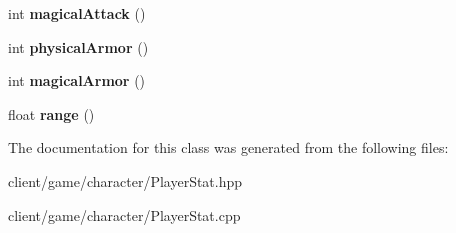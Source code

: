 \begin{DoxyCompactItemize}
\item 
\hypertarget{classgame_1_1_player_stat_a3e2e8f2b1d0427e9d9cf4bb9c482c909}{int {\bfseries magical\-Attack} ()}\label{classgame_1_1_player_stat_a3e2e8f2b1d0427e9d9cf4bb9c482c909}

\item 
\hypertarget{classgame_1_1_player_stat_a0db1adc0a2061d529905a4af4fae0bb7}{int {\bfseries physical\-Armor} ()}\label{classgame_1_1_player_stat_a0db1adc0a2061d529905a4af4fae0bb7}

\item 
\hypertarget{classgame_1_1_player_stat_abde5a723f3e5de5840ece138455065be}{int {\bfseries magical\-Armor} ()}\label{classgame_1_1_player_stat_abde5a723f3e5de5840ece138455065be}

\item 
\hypertarget{classgame_1_1_player_stat_ae1b97159eb23416a14ccbc719bfd9193}{float {\bfseries range} ()}\label{classgame_1_1_player_stat_ae1b97159eb23416a14ccbc719bfd9193}

\end{DoxyCompactItemize}


The documentation for this class was generated from the following files\-:\begin{DoxyCompactItemize}
\item 
client/game/character/Player\-Stat.\-hpp\item 
client/game/character/Player\-Stat.\-cpp\end{DoxyCompactItemize}
